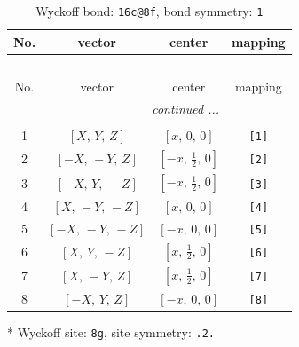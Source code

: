 \documentclass[fleqn,8pt]{jsarticle}
\begin{document}
\renewcommand{\arraystretch}{1.2}
\begin{longtable}{cccc}
\caption{Wyckoff bond: {\tt 16c@8f}, bond symmetry: {\tt 1}}
 \\
 \hline \hline
No. & vector & center & mapping \\ \hline \endfirsthead

\multicolumn{3}{l}{\tablename\ \thetable{}} \\
 \hline \hline
No. & vector & center & mapping \\ \hline \endhead

 \hline \hline
\multicolumn{3}{r}{\footnotesize\it continued ...} \\ \endfoot

 \hline \hline
\multicolumn{3}{r}{} \\ \endlastfoot

1 & $\left[ X,\, Y,\, Z \right]$ & $\left[ x,\, 0,\, 0 \right]$ & {\tt [1]} \\ \hline
2 & $\left[ - X,\, - Y,\, Z \right]$ & $\left[ - x,\, \frac{1}{2},\, 0 \right]$ & {\tt [2]} \\ \hline
3 & $\left[ - X,\, Y,\, - Z \right]$ & $\left[ - x,\, \frac{1}{2},\, 0 \right]$ & {\tt [3]} \\ \hline
4 & $\left[ X,\, - Y,\, - Z \right]$ & $\left[ x,\, 0,\, 0 \right]$ & {\tt [4]} \\ \hline
5 & $\left[ - X,\, - Y,\, - Z \right]$ & $\left[ - x,\, 0,\, 0 \right]$ & {\tt [5]} \\ \hline
6 & $\left[ X,\, Y,\, - Z \right]$ & $\left[ x,\, \frac{1}{2},\, 0 \right]$ & {\tt [6]} \\ \hline
7 & $\left[ X,\, - Y,\, Z \right]$ & $\left[ x,\, \frac{1}{2},\, 0 \right]$ & {\tt [7]} \\ \hline
8 & $\left[ - X,\, Y,\, Z \right]$ & $\left[ - x,\, 0,\, 0 \right]$ & {\tt [8]} \\
\end{longtable}
* Wyckoff site: {\tt 8g}, site symmetry: {\tt .2.}
\renewcommand{\arraystretch}{1.2}
\end{document}
